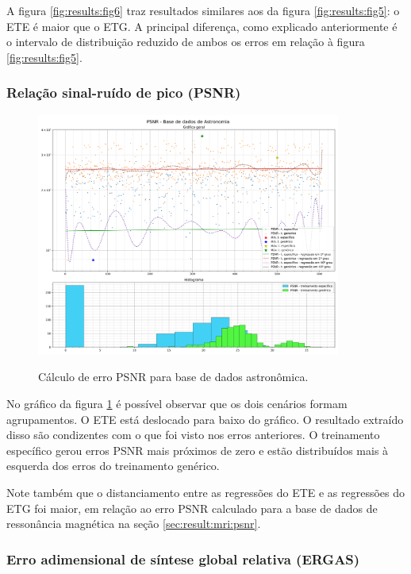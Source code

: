 A figura \ref{fig:results:fig6} traz resultados similares aos da figura \ref{fig:results:fig5}: o ETE é maior que o ETG. A principal diferença, como explicado anteriormente é o intervalo de distribuição reduzido de ambos os erros em relação à figura \ref{fig:results:fig5}.

\subsubsection{Relação sinal-ruído de pico (PSNR)}
\label{sec:result:astronomy:psnr}

\begin{figure}[H]
    \centering
    \caption{Cálculo de erro PSNR para base de dados astronômica.}
    \includegraphics[width=10cm]{fig/resultados/astronomy/png/psnr_astronomy_compound.png}
    \label{fig:results:fig7}
\end{figure}

No gráfico da figura \ref{fig:results:fig7} é possível observar que os dois cenários formam agrupamentos. O ETE está deslocado para baixo do gráfico. O resultado extraído disso são condizentes com o que foi visto nos erros anteriores. O treinamento específico gerou erros PSNR mais próximos de zero e estão distribuídos mais à esquerda dos erros do treinamento genérico.

Note também que o distanciamento entre as regressões do ETE e as regressões do ETG foi maior, em relação ao erro PSNR calculado para a base de dados de ressonância magnética na seção \ref{sec:result:mri:psnr}. 

\subsubsection{Erro adimensional de síntese global relativa (ERGAS)}
\label{sec:result:astronomy:ergas}

